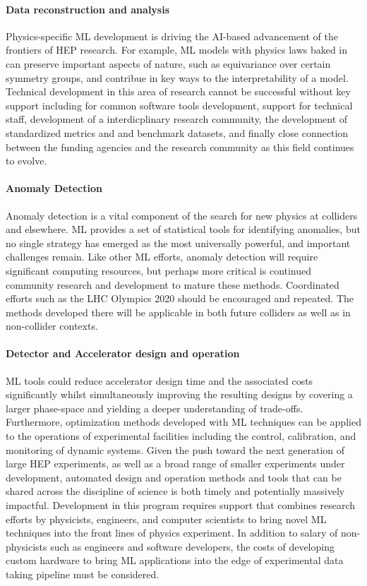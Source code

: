 \documentclass[submission,Phys]{SciPost}
\begin{document}
\paragraph{Data reconstruction and analysis} 
Physics-specific ML development is driving the AI-based advancement of the frontiers of HEP research. For example, ML models with physics laws baked in can preserve important aspects of nature, such as equivariance over certain symmetry groups, and contribue in key ways to the interpretability of a model. Technical development in this area of research cannot be successful without key support including for common software tools development, support for technical staff, development of a interdicplinary research community, the development of standardized metrics and and benchmark datasets, and finally close connection between the funding agencies and the research community as this field continues to evolve.

\paragraph{Anomaly Detection}
Anomaly detection is a vital component of the search for new physics at colliders and elsewhere. ML provides a set of  statistical tools for identifying anomalies, but no single strategy has emerged as the most universally powerful, and important challenges remain.
Like other ML efforts, anomaly detection will require significant computing resources, but perhaps more critical is continued community research and development to mature these methods.  Coordinated efforts such as the LHC Olympics 2020 should be encouraged and repeated. The methods developed there will be applicable in both future colliders as well as in non-collider contexts.


\paragraph{Detector and Accelerator design and operation}
 ML tools could reduce accelerator design time and the associated costs significantly whilst simultaneously improving the resulting designs by covering a larger phase-space and yielding a deeper understanding of trade-offs. Furthermore, optimization methods developed with ML techniques can be applied to the operations of experimental facilities including the control, calibration, and monitoring of dynamic systems. Given the push toward the next generation of large HEP experiments, as well as a broad range of smaller experiments under development, automated design and operation methods and tools that can be shared across the discipline of science is both timely and potentially massively impactful. Development in this program requires support that combines research efforts by physicists, engineers, and computer scientists to bring novel ML techniques into the front lines of physics experiment. In addition to salary of non-physicists such as engineers and software developers, the costs of developing custom hardware to bring ML applications into the edge of experimental data taking pipeline must be considered.
\end{document}
